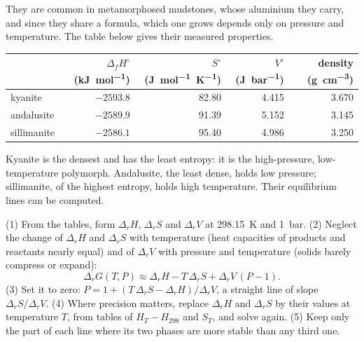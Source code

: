 They are common in metamorphosed mudstones, whose aluminium they carry, and since they
share a formula, which one grows depends only on pressure and temperature. The table
below gives their measured properties.

\begin{center}
\small
\begin{tabular}{@{}lrrrr@{}}
\hline
 & $\Delta_f H^\circ$ (\unit{kJ.mol^{-1}}) & $S^\circ$ (\unit{J.mol^{-1}.K^{-1}}) & $V^\circ$ (\unit{J.bar^{-1}}) & density (\unit{g.cm^{-3}})\\
\hline
kyanite & $-2593.8$ & 82.80 & 4.415 & 3.670\\
andalusite & $-2589.9$ & 91.39 & 5.152 & 3.145\\
sillimanite & $-2586.1$ & 95.40 & 4.986 & 3.250\\
\hline
\end{tabular}
\par{}
\end{center}

Kyanite is the densest and has the least entropy: it is the high-pressure,
low-temperature polymorph. Andalusite, the least dense, holds low pressure; sillimanite,
of the highest entropy, holds high temperature. Their equilibrium lines can be computed.

\begin{method}\label{met:b2:metamorphic-facies:line}
(1) From the tables, form $\Delta_r H$, $\Delta_r S$ and $\Delta_r V$ at \qty{298.15}{K}
and \qty{1}{bar}. (2) Neglect the change of $\Delta_r H$ and $\Delta_r S$ with
temperature (heat capacities of products and reactants nearly equal) and of $\Delta_r V$
with pressure and temperature (solids barely compress or expand):
\[
\Delta_r G(T, P) \approx \Delta_r H - T\,\Delta_r S + \Delta_r V\,(P - 1).
\]
(3) Set it to zero: $P = 1 + (T\,\Delta_r S - \Delta_r H)/\Delta_r V$, a straight line of
slope $\Delta_r S/\Delta_r V$. (4) Where precision matters, replace $\Delta_r H$ and
$\Delta_r S$ by their values at temperature $T$, from tables of $H_T - H_{298}$ and $S_T$,
and solve again. (5) Keep only the part of each line where its two phases are more stable
than any third one.
\end{method}

